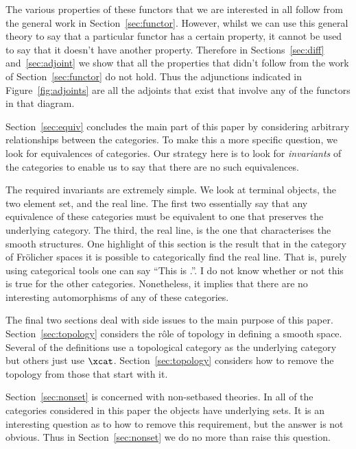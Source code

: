 \documentclass[%
a4paper,%
arxiv,%
defaults
]{myclass}
\begin{document}
The various properties of these functors that we are interested in all follow from the general work in Section~\ref{sec:functor}.
However, whilst we can use this general theory to say that a particular functor has a certain property, it cannot be used to say that it doesn't have another property.
Therefore in Sections~\ref{sec:diff} and~\ref{sec:adjoint} we show that all the properties that didn't follow from the work of Section~\ref{sec:functor} do not hold.
Thus the adjunctions indicated in Figure~\ref{fig:adjoints} are all the adjoints that exist that involve any of the functors in that diagram.

\medskip

Section~\ref{sec:equiv} concludes the main part of this paper by considering arbitrary relationships between the categories.
To make this a more specific question, we look for equivalences of categories.
Our strategy here is to look for \emph{invariants} of the categories to enable us to say that there are no such equivalences.

The required invariants are extremely simple.
We look at terminal objects, the two element set, and the real line.
The first two essentially say that any equivalence of these categories must be equivalent to one that preserves the underlying category.
The third, the real line, is the one that characterises the smooth structures.
One highlight of this section is the result that in the category of Fr\"olicher spaces it is possible to categorically find the real line.
That is, purely using categorical tools one can say ``This is \R.''.
I do not know whether or not this is true for the other categories.
Nonetheless, it implies that there are no interesting automorphisms of any of these categories.

\medskip

The final two sections deal with side issues to the main purpose of this paper.
Section~\ref{sec:topology} considers the r\^ole of topology in defining a smooth space.
Several of the definitions use a topological category as the underlying category but others just use \(\xcat\).
Section~\ref{sec:topology} considers how to remove the topology from those that start with it.

Section~\ref{sec:nonset} is concerned with non\hyp{}set\enhyp{}based theories.
In all of the categories considered in this paper the objects have underlying sets.
It is an interesting question as to how to remove this requirement, but the answer is not obvious.
Thus in Section~\ref{sec:nonset} we do no more than raise this question.
\end{document}
